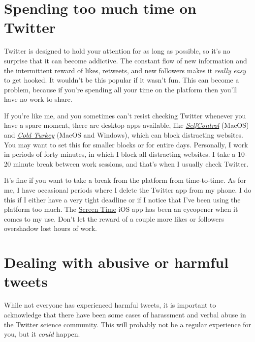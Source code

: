 \documentclass[
]{book}
\begin{document}
\hypertarget{spending-too-much-time-on-twitter}{%
\section*{Spending too much time on Twitter}\label{spending-too-much-time-on-twitter}}

Twitter is designed to hold your attention for as long as possible, so it's no surprise that it can become addictive. The constant flow of new information and the intermittent reward of likes, retweets, and new followers makes it \emph{really easy} to get hooked. It wouldn't be this popular if it wasn't fun. This can become a problem, because if you're spending all your time on the platform then you'll have no work to share.

If you're like me, and you sometimes can't resist checking Twitter whenever you have a spare moment, there are desktop apps available, like \href{https://selfcontrolapp.com/}{\emph{SelfControl}} (MacOS) and \href{https://getcoldturkey.com/}{\emph{Cold Turkey}} (MacOS and Windows), which can block distracting websites. You may want to set this for smaller blocks or for entire days. Personally, I work in periods of forty minutes, in which I block all distracting websites. I take a 10-20 minute break between work sessions, and that's when I usually check Twitter.

It's fine if you want to take a break from the platform from time-to-time. As for me, I have occasional periods where I delete the Twitter app from my phone. I do this if I either have a very tight deadline or if I notice that I've been using the platform too much. The \href{https://support.apple.com/en-us/HT208982}{Screen Time} iOS app has been an eyeopener when it comes to my use. Don't let the reward of a couple more likes or followers overshadow lost hours of work.

\hypertarget{dealing-with-abusive-or-harmful-tweets}{%
\section*{Dealing with abusive or harmful tweets}\label{dealing-with-abusive-or-harmful-tweets}}

While not everyone has experienced harmful tweets, it is important to acknowledge that there have been some cases of harassment and verbal abuse in the Twitter science community. This will probably not be a regular experience for you, but it \emph{could} happen.
\end{document}
